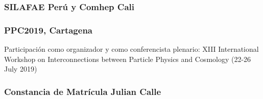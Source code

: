 \newpage
\subsubsection{SILAFAE Perú y Comhep Cali}
\label{sec:comhep-cali}

\begin{includepdfs}
  
\end{includepdfs}


\newpage
\subsubsection{PPC2019, Cartagena}
\label{sec:ppc2019}

Participación como organizador y como conferencista plenario: XIII International Workshop on Interconnections between Particle Physics and Cosmology  (22-26 July 2019)
\begin{includepdfs}
  
\end{includepdfs}


\newpage
\subsubsection{Constancia de Matrícula Julian Calle}
\label{sec:constancia}

\begin{includepdfs}
  
\end{includepdfs}



%   

          


